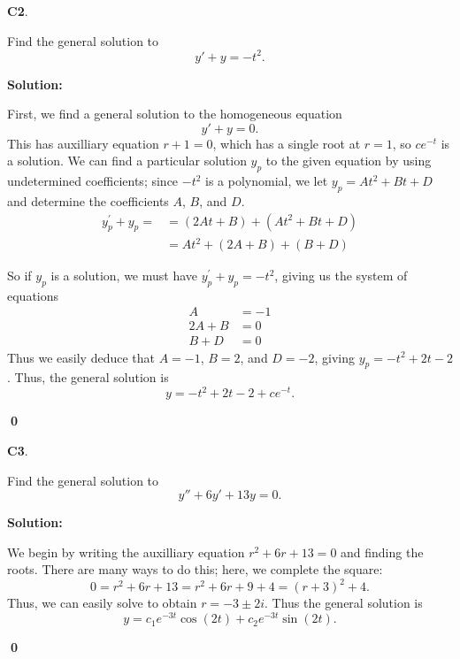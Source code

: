 \documentclass{article}
\newenvironment{problem}[1]
{
  \begin{flushleft}
  \textbf{#1}.
  \ignorespaces
}
{
  \end{flushleft}
}
\newenvironment{solution}
{
  \ignorespaces
  \textbf{Solution:}
}
{
  \ignorespacesafterend
  \begin{flushright}
  {\bfseries \qed}
  \end{flushright}
}
\begin{document}
\begin{problem}{C2}
Find the general solution to \[y'+y=-t^2.\]
\end{problem}
\begin{solution}
First, we find a general solution to the homogeneous equation \[y'+y=0.\]  This has auxilliary equation \(r+1=0\), which has a single root at \(r=1\), so \(ce^{-t}\) is a solution.  We can find a particular solution \(y_p\) to the given equation by using undetermined coefficients; since \(-t^2\) is a polynomial, we let \(y_p = At^2+Bt+D\) and determine the coefficients \(A\), \(B\), and \(D\).  
\begin{align*}
y_p ^\prime +y_p= &= (2At+B)+(At^2+Bt+D) \\
&= At^2+(2A+B)+(B+D)
\end{align*}

So if \(y_p\) is a solution, we must have \(y_p ^\prime+y_p = -t^2\), giving us the system of equations
\begin{align*}
A&=-1 \\ 2A+B &= 0 \\ B+D&=0
\end{align*}
Thus we easily deduce that \(A=-1\), \(B=2\), and \(D=-2\), giving \(y_p = -t^2+2t-2\).  Thus, the general solution is
\[y = -t^2+2t-2+ce^{-t}.\]
\end{solution}

\begin{problem}{C3}
Find the general solution to \[y''+6y'+13y=0.\]
\end{problem}
\begin{solution}
We begin by writing the auxilliary equation \(r^2+6r+13=0\) and finding the roots.  There are many ways to do this; here, we complete  the square:
\[0=r^2+6r+13=r^2+6r+9+4=(r+3)^2+4.\]
Thus, we can easily solve to obtain \(r=-3\pm2i\).  Thus the general solution is
\[ y= c_1 e^{-3t} \cos(2t) + c_2 e^{-3t} \sin(2t) .\]
\end{solution}
\end{document}
